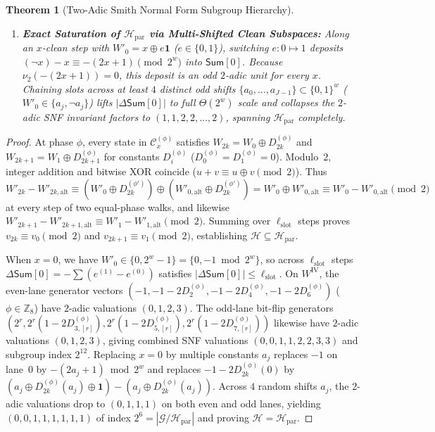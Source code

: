 \documentclass[11pt,a4paper]{article}
\newtheorem{theorem}{Theorem}
\theoremstyle{definition}
\theoremstyle{remark}
\newcommand{\SumAcc}{\mathsf{Sum}}
\newcommand{\Hpar}{\mathcal{H}_{\mathrm{par}}}
\begin{document}
\begin{theorem}[Two-Adic Smith Normal Form Subgroup Hierarchy]
\begin{enumerate}[leftmargin=2em]
    \[
        \bigl|\Delta\SumAcc[0]\bigr| \le \ell_{\mathrm{slot}} \quad\bigl(\text{and empirically } \le \ell_{\mathrm{slot}}/8 \ll 2^{w-1}\bigr).
    \]
    \item \textbf{Exact Saturation of $\Hpar$ via Multi-Shifted Clean Subspaces:} Along an $x$-clean step with $W'_0 = x \oplus e\mathbf{1}$ ($e \in \{0,1\}$), switching $e: 0 \mapsto 1$ deposits $(\neg x) - x \equiv -(2x + 1) \pmod{2^w}$ into $\SumAcc[0]$. Because $\nu_2(-(2x + 1)) = 0$, this deposit is an odd $2$-adic unit for every $x$. Chaining slots across at least $4$ distinct odd shifts $\{a_0, \dots, a_{J-1}\} \subset \{0,1\}^w$ ($W'_0 \in \{a_j, \neg a_j\}$) lifts $|\Delta\SumAcc[0]|$ to full $\Theta(2^w)$ scale and collapses the $2$-adic SNF invariant factors to $(1, 1, 2, 2, \dots, 2)$, spanning $\Hpar$ completely.
\end{enumerate}
\end{theorem}

\begin{proof}
At phase $\phi$, every state in $\mathcal{C}_x^{(\phi)}$ satisfies $W_{2k} = W_0 \oplus D_{2k}^{(\phi)}$ and $W_{2k+1} = W_1 \oplus D_{2k+1}^{(\phi)}$ for constants $D_i^{(\phi)}$ ($D_0^{(\phi)} = D_1^{(\phi)} = 0$). Modulo~$2$, integer addition and bitwise XOR coincide ($u + v \equiv u \oplus v \pmod 2$). Thus $W'_{2k} - W'_{2k,\mathrm{alt}} \equiv (W'_0 \oplus D_{2k}^{(\phi')}) \oplus (W'_{0,\mathrm{alt}} \oplus D_{2k}^{(\phi')}) = W'_0 \oplus W'_{0,\mathrm{alt}} \equiv W'_0 - W'_{0,\mathrm{alt}} \pmod 2$ at every step of two equal-phase walks, and likewise $W'_{2k+1} - W'_{2k+1,\mathrm{alt}} \equiv W'_1 - W'_{1,\mathrm{alt}} \pmod 2$. Summing over $\ell_{\mathrm{slot}}$ steps proves $v_{2k} \equiv v_0 \pmod 2$ and $v_{2k+1} \equiv v_1 \pmod 2$, establishing $\mathcal{H} \subseteq \Hpar$.

When $x = 0$, we have $W'_0 \in \{0, 2^w - 1\} = \{0, -1 \bmod 2^w\}$, so across $\ell_{\mathrm{slot}}$ steps $\Delta\SumAcc[0] = -\sum (e^{(1)} - e^{(0)})$ satisfies $|\Delta\SumAcc[0]| \le \ell_{\mathrm{slot}}$. On $W^{\mathrm{IV}}$, the even-lane generator vectors $(-1, -1 - 2 D_2^{(\phi)}, -1 - 2 D_4^{(\phi)}, -1 - 2 D_6^{(\phi)})$ ($\phi \in \mathbb{Z}_8$) have $2$-adic valuations $(0, 1, 2, 3)$. The odd-lane bit-flip generators $(2^r, 2^r(1 - 2 D_{3,[r]}^{(\phi)}), 2^r(1 - 2 D_{5,[r]}^{(\phi)}), 2^r(1 - 2 D_{7,[r]}^{(\phi)}))$ likewise have $2$-adic valuations $(0, 1, 2, 3)$, giving combined SNF valuations $(0, 0, 1, 1, 2, 2, 3, 3)$ and subgroup index $2^{12}$. Replacing $x = 0$ by multiple constants $a_j$ replaces $-1$ on lane~$0$ by $-\!(2a_j + 1) \bmod 2^w$ and replaces $-1 - 2 D_{2k}^{(\phi)}(0)$ by $(a_j \oplus D_{2k}^{(\phi)}(a_j) \oplus \mathbf{1}) - (a_j \oplus D_{2k}^{(\phi)}(a_j))$. Across $4$ random shifts $a_j$, the $2$-adic valuations drop to $(0, 1, 1, 1)$ on both even and odd lanes, yielding $(0, 0, 1, 1, 1, 1, 1, 1)$ of index $2^6 = |\mathcal{G}/\Hpar|$ and proving $\mathcal{H} = \Hpar$.
\end{proof}
\end{document}
